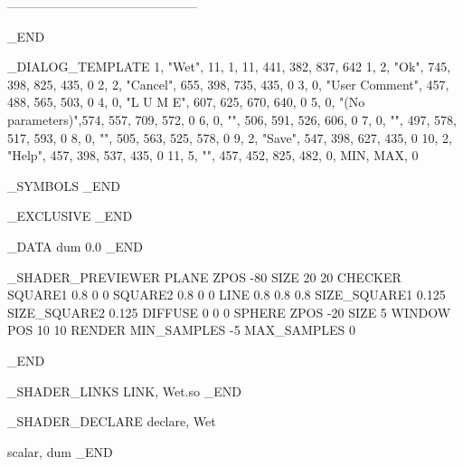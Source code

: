---------------------------------------------

_END


_DIALOG_TEMPLATE
1,	"Wet", 11,	1,	11,	441, 382, 837, 642
   1,	2,	"Ok",		745, 398, 825, 435, 0
   2,	2,	"Cancel",	655, 398, 735, 435, 0
   3,	0,	"User Comment",	457, 488, 565, 503, 0
   4,	0,	"L U M E",	607, 625, 670, 640, 0
   5,	0,	"(No parameters)",574, 557, 709, 572, 0
   6,	0,	"",		506, 591, 526, 606, 0
   7,	0,	"",		497, 578, 517, 593, 0
   8,	0,	"",		505, 563, 525, 578, 0
   9,	2,	"Save",		547, 398, 627, 435, 0
   10,	2,	"Help",		457, 398, 537, 435, 0
   11,	5,	"",		457, 452, 825, 482, 0, MIN, MAX, 0

_SYMBOLS
_END

_EXCLUSIVE
_END



_DATA
dum 0.0
_END


_SHADER_PREVIEWER
PLANE
  ZPOS -80
  SIZE 20 20
  CHECKER
    SQUARE1 0.8 0 0
    SQUARE2 0.8 0 0
    LINE 0.8 0.8 0.8
    SIZE_SQUARE1 0.125
    SIZE_SQUARE2 0.125
    DIFFUSE 0 0 0
SPHERE
  ZPOS -20
  SIZE 5
WINDOW
  POS 10 10
RENDER
  MIN_SAMPLES -5
  MAX_SAMPLES 0

_END


_SHADER_LINKS
LINK, Wet.so
_END

_SHADER_DECLARE
declare,	Wet

scalar,		dum
_END
